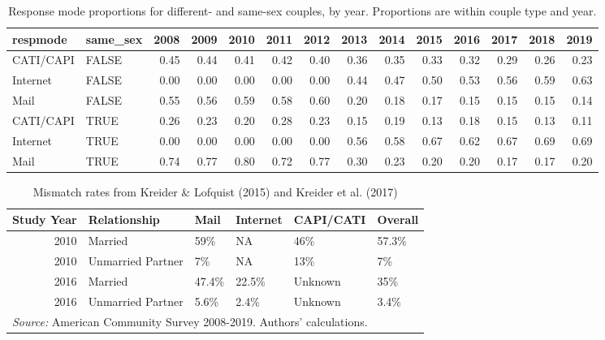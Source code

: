\documentclass[
  11pt,
]{article}
\begin{document}
\begin{table}

\caption{\label{tab:respmode}Response mode proportions for different- and same-sex couples, by year. Proportions are within couple type and year.}
\centering
\fontsize{9}{11}\selectfont
\begin{tabular}[t]{llrrrrrrrrrrrr}
\toprule
respmode & same\_sex & 2008 & 2009 & 2010 & 2011 & 2012 & 2013 & 2014 & 2015 & 2016 & 2017 & 2018 & 2019\\
\midrule
CATI/CAPI & FALSE & 0.45 & 0.44 & 0.41 & 0.42 & 0.40 & 0.36 & 0.35 & 0.33 & 0.32 & 0.29 & 0.26 & 0.23\\
Internet & FALSE & 0.00 & 0.00 & 0.00 & 0.00 & 0.00 & 0.44 & 0.47 & 0.50 & 0.53 & 0.56 & 0.59 & 0.63\\
Mail & FALSE & 0.55 & 0.56 & 0.59 & 0.58 & 0.60 & 0.20 & 0.18 & 0.17 & 0.15 & 0.15 & 0.15 & 0.14\\
CATI/CAPI & TRUE & 0.26 & 0.23 & 0.20 & 0.28 & 0.23 & 0.15 & 0.19 & 0.13 & 0.18 & 0.15 & 0.13 & 0.11\\
Internet & TRUE & 0.00 & 0.00 & 0.00 & 0.00 & 0.00 & 0.56 & 0.58 & 0.67 & 0.62 & 0.67 & 0.69 & 0.69\\
\addlinespace
Mail & TRUE & 0.74 & 0.77 & 0.80 & 0.72 & 0.77 & 0.30 & 0.23 & 0.20 & 0.20 & 0.17 & 0.17 & 0.20\\
\bottomrule
\end{tabular}
\end{table}

\begin{table}

\caption{\label{tab:mismatch}Mismatch rates from Kreider \& Lofquist (2015) and Kreider et al. (2017)}
\centering
\begin{tabular}[t]{rlllll}
\toprule
Study Year & Relationship & Mail & Internet & CAPI/CATI & Overall\\
\midrule
2010 & Married & 59\% & NA & 46\% & 57.3\%\\
2010 & Unmarried Partner & 7\% & NA & 13\% & 7\%\\
2016 & Married & 47.4\% & 22.5\% & Unknown & 35\%\\
2016 & Unmarried Partner & 5.6\% & 2.4\% & Unknown & 3.4\%\\
\bottomrule
\multicolumn{6}{l}{\rule{0pt}{1em}\textit{Source:} American Community Survey 2008-2019. Authors' calculations.}\\
\end{tabular}
\end{table}
\end{document}
